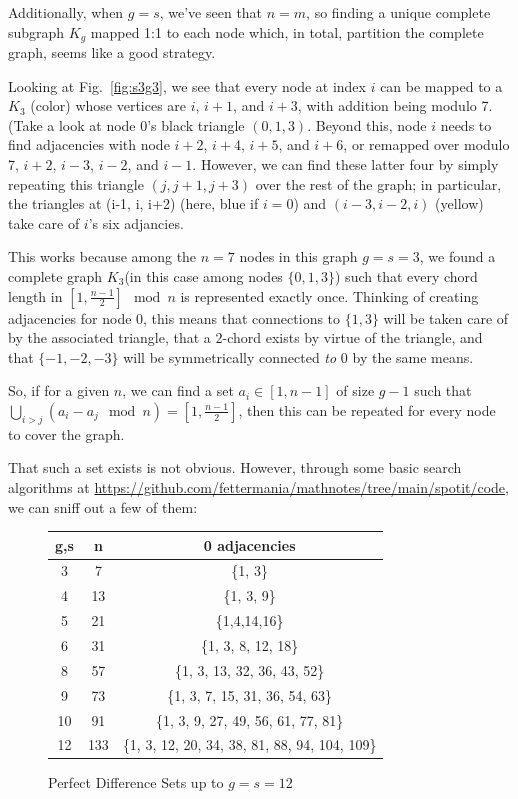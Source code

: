 \documentclass[11pt, oneside]{article} 	%
\begin{document}
Additionally, when $g=s$, we've seen that $n = m$, so finding a unique complete subgraph $K_g$ mapped 1:1 to each node which, in total, partition the complete graph, seems like a good strategy.

Looking at Fig.~\ref{fig:s3g3}, we see that every node at index $i$ can be mapped to a $K_3$ (color) whose vertices are $i$, $i+1$, and $i+3$, with addition being modulo 7. (Take a look at node 0's black triangle $(0, 1, 3)$. Beyond this, node $i$ needs to find adjacencies with node $i+2$, $i+4$, $i+5$, and $i+6$, or remapped over modulo 7, $i+2$, $i-3$, $i-2$, and $i-1$. However, we can find these latter four by simply repeating this triangle $(j, j+1, j+3)$ over the rest of the graph; in particular, the triangles at (i-1, i, i+2) (here, blue if $i=0$) and $(i-3, i-2, i)$ (yellow) take care of $i$'s six adjancies.

This works because among the $n=7$ nodes in this graph $g=s=3$, we found a complete graph $K_3$(in this case among nodes $\{0, 1, 3\}$) such that every chord length in $[1, \frac{n-1}{2}]\mod n$ is represented exactly once. Thinking of creating adjacencies for node 0, this means that connections to $\{1, 3\}$ will be taken care of by the associated triangle, that a $2$-chord exists by virtue of the triangle, and that $\{-1, -2, -3\}$ will be symmetrically connected \emph{to} 0 by the same means.

So, if for a given $n$, we can find a set $a_i \in [1,n-1]$ of size $g-1$ such that $\bigcup_{i > j} (a_i - a_j \mod n) = [1, \frac{n-1}{2}]$, then this can be repeated for every node to cover the graph.

That such a set exists is not obvious. However, through some basic search algorithms at \url{https://github.com/fettermania/mathnotes/tree/main/spotit/code}, we can sniff out a few of them:

\begin{figure}[!htb]
 \begin{tabular}{c c | c }
 g,s & n & 0 adjacencies \\
\hline
 3 & 7 & \{1, 3\} \\
 4 & 13 & \{1, 3, 9\} \\
 5 & 21 & \{1,4,14,16\} \\
 6 & 31 & \{1, 3, 8, 12, 18\} \\
 8 & 57 & \{1, 3, 13, 32, 36, 43, 52\} \\
 9 & 73 & \{1, 3, 7, 15, 31, 36, 54, 63\} \\
 10 & 91 & \{1, 3, 9, 27, 49, 56, 61, 77, 81\} \\
 12 & 133 & \{1, 3, 12, 20, 34, 38, 81, 88, 94, 104, 109\} \\
 \end{tabular}
 \caption{Perfect Difference Sets up to $g=s=12$}
\label{fig:perfect-diffs}
\end{figure}
\end{document}

